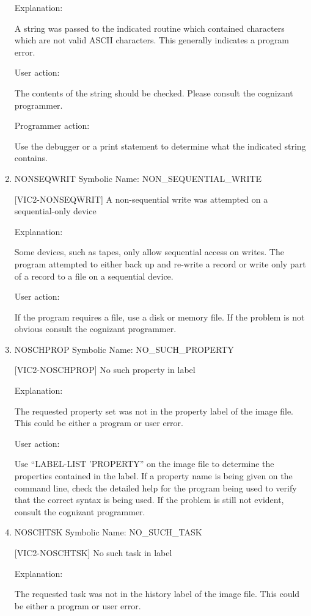 \begin{enumerate}
Explanation:

A string was passed to the indicated routine which contained
characters which are not valid ASCII characters.  This generally
indicates a program error.

User action:

The contents of the string should be checked.  Please consult
the cognizant programmer.

Programmer action:

Use the debugger or a print statement to determine what the
indicated string contains.


\item NONSEQWRIT Symbolic Name: NON\_SEQUENTIAL\_WRITE

[VIC2-NONSEQWRIT] A non-sequential write was attempted on a sequential-only device

Explanation:

Some devices, such as tapes, only allow sequential access on
writes.  The program attempted to either back up and re-write
a record or write only part of a record to a file on a
sequential device.

User action:

If the program requires a file, use a disk or memory file.
If the problem is not obvious consult the cognizant programmer.


\item NOSCHPROP Symbolic Name: NO\_SUCH\_PROPERTY

[VIC2-NOSCHPROP] No such property in label

Explanation:

The requested property set was not in the property label of the image file.
This could be either a program or user error.

User action:

Use ``LABEL-LIST 'PROPERTY'' on the image file to determine the properties
contained in the label.  If a property name is being given on the
command line, check the detailed help for the program being used to
verify that the correct syntax is being used.  If the problem is
still not evident, consult the cognizant programmer.


\item NOSCHTSK Symbolic Name: NO\_SUCH\_TASK

[VIC2-NOSCHTSK] No such task in label

Explanation:

The requested task was not in the history label of the image file.
This could be either a program or user error.


\end{enumerate}
